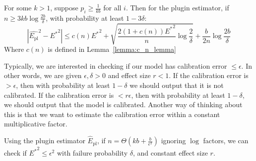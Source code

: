 \begin{theorem}
\label{thm:plugin-bound}
For some $k > 1$, suppose $p_i \geq \frac{1}{kb}$ for all $i$. Then for the plugin estimator, if $n \geq 3kb \log{\frac{2b}{\delta}}$, with probability at least $1 - 3\delta$:
\[ | \hat{E_{\mbox{pl}}}^2 - {E^*}^2 | \leq c(n){E^*}^2 + \sqrt{\frac{2(1+c(n)){E^*}^2}{n} \log{\frac{2}{\delta}}} + \frac{b}{2n} \log{\frac{2b}{\delta}} \]
Where $c(n)$ is defined in Lemma~\ref{lemma:c_n_lemma}
\end{theorem}

Typically, we are interested in checking if our model has calibration error $\leq \epsilon$. In other words, we are given $\epsilon, \delta > 0$ and effect size $r < 1$. If the calibration error is $> \epsilon$, then with probability at least $1 - \delta$ we should output that it is not calibrated. If the calibration error is $< r\epsilon$, then with probability at least $1 - \delta$, we should output that the model is calibrated. Another way of thinking about this is that we want to estimate the calibration error within a constant multiplicative factor.

\begin{theorem}
\label{thm:final-plugin}
Using the plugin estimator $\hat{E}_{\mbox{pl}}$, if $n = \Theta(kb + \frac{b}{\epsilon^2})$ ignoring $\log$ factors, we can check if ${E^*}^2 \leq \epsilon^2$ with failure probability $\delta$, and constant effect size $r$. 
\end{theorem}


